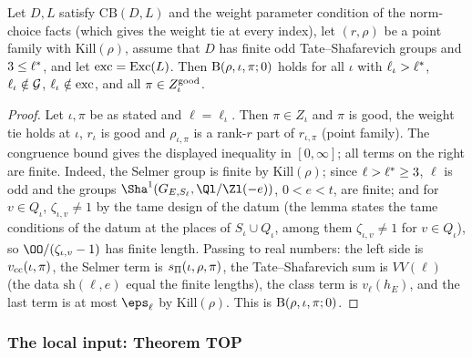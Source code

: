 \begin{lemma}\label{pf:linkN-sel:large}
Let $D,L$ satisfy $\mathrm{CB}(D,L)$ and the weight parameter condition of the norm-choice facts (which gives the weight tie at every index),
let $(r,\rho)$ be a point family with $\mathrm{Kill}(\rho)$, assume that $D$ has finite odd Tate--Shafarevich groups and $3\le\ell^{*}$,
and let $\mathrm{exc}=\mathrm{Exc}(L)$. Then $\mathrm{B}(\rho,\iota,\pi;0)$ holds for all $\iota$ with $\ell_\iota>\ell^{*}$,
$\ell_\iota\notin\mathcal G$, $\ell_\iota\notin\mathrm{exc}$, and all $\pi\in Z^{\mathrm{good}}_\iota$.
\end{lemma}

\begin{proof}
Let $\iota,\pi$ be as stated and $\ell=\ell_\iota$. Then $\pi\in Z_\iota$ and $\pi$ is good, the weight tie holds at $\iota$, $r_\iota$ is good and
$\rho_{\iota,\pi}$ is a rank-$r$ part of $r_{\iota,\pi}$ (point family). The congruence bound gives the displayed inequality in $[0,\infty]$; all
terms on the right are finite. Indeed, the Selmer group is finite by $\mathrm{Kill}(\rho)$; since $\ell>\ell^{*}\ge3$, $\ell$ is odd and the
groups $\Sha^1(G_{E,S_\ell},\Ql/\Zl(-e))$, $0<e<t$, are finite; and for $v\in Q_\iota$, $\zeta_{\iota,v}\ne1$ by the tame design of the datum
(the lemma  states the tame conditions of the datum at the places of $S_\iota\cup Q_\iota$, among them
$\zeta_{\iota,v}\ne1$ for $v\in Q_\iota$), so
$\OO/(\zeta_{\iota,v}-1)$ has finite length. Passing to real numbers: the left side is $v_{\mathrm{cc}}(\iota,\pi)$, the Selmer term is
$s_{\Pi}(\iota,\rho,\pi)$, the Tate--Shafarevich sum is $VV(\ell)$ (the data $\mathrm{sh}(\ell,e)$ equal the finite lengths), the class term
is $v_\ell(h_E)$, and the last term is at most $\eps_\ell$ by $\mathrm{Kill}(\rho)$. This is $\mathrm{B}(\rho,\iota,\pi;0)$.
\end{proof}

\subsubsection{The local input: Theorem TOP}


